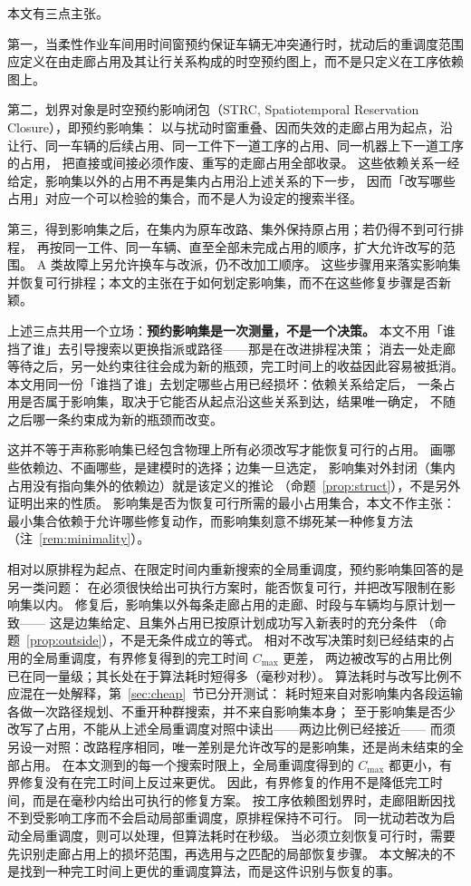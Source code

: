 \documentclass[manuscript,screen,review]{acmart}
\providecommand{\STRC}{\textsc{STRC}}
\begin{document}
本文有三点主张。

第一，当柔性作业车间用时间窗预约保证车辆无冲突通行时，扰动后的重调度范围应定义在由走廊占用及其让行关系构成的时空预约图上，而不是只定义在工序依赖图上。

第二，划界对象是时空预约影响闭包（\STRC, Spatiotemporal Reservation Closure），即预约影响集：
以与扰动时窗重叠、因而失效的走廊占用为起点，沿让行、同一车辆的后续占用、同一工件下一道工序的占用、同一机器上下一道工序的占用，
把直接或间接必须作废、重写的走廊占用全部收录。
这些依赖关系一经给定，影响集以外的占用不再是集内占用沿上述关系的下一步，
因而「改写哪些占用」对应一个可以检验的集合，而不是人为设定的搜索半径。

第三，得到影响集之后，在集内为原车改路、集外保持原占用；若仍得不到可行排程，
再按同一工件、同一车辆、直至全部未完成占用的顺序，扩大允许改写的范围。
A 类故障上另允许换车与改派，仍不改加工顺序。
这些步骤用来落实影响集并恢复可行排程；本文的主张在于如何划定影响集，而不在这些修复步骤是否新颖。

上述三点共用一个立场：\textbf{预约影响集是一次测量，不是一个决策。}
本文不用「谁挡了谁」去引导搜索以更换指派或路径——那是在改进排程决策；
消去一处走廊等待之后，另一处约束往往会成为新的瓶颈，完工时间上的收益因此容易被抵消。
本文用同一份「谁挡了谁」去划定哪些占用已经损坏：依赖关系给定后，
一条占用是否属于影响集，取决于它能否从起点沿这些关系到达，结果唯一确定，
不随之后哪一条约束成为新的瓶颈而改变。

这并不等于声称影响集已经包含物理上所有必须改写才能恢复可行的占用。
画哪些依赖边、不画哪些，是建模时的选择；边集一旦选定，
影响集对外封闭（集内占用没有指向集外的依赖边）就是该定义的推论
（命题~\ref{prop:struct}），不是另外证明出来的性质。
影响集是否为恢复可行所需的最小占用集合，本文不作主张：
最小集合依赖于允许哪些修复动作，而影响集刻意不绑死某一种修复方法
（注~\ref{rem:minimality}）。

相对以原排程为起点、在限定时间内重新搜索的全局重调度，预约影响集回答的是另一类问题：
在必须很快给出可执行方案时，能否恢复可行，并把改写限制在影响集以内。
修复后，影响集以外每条走廊占用的走廊、时段与车辆均与原计划一致——
这是边集给定、且集外占用已按原计划成功写入新表时的充分条件
（命题~\ref{prop:outside}），不是无条件成立的等式。
相对不改写决策时刻已经结束的占用的全局重调度，有界修复得到的完工时间 \(C_{\max}\) 更差，
两边被改写的占用比例已在同一量级；其长处在于算法耗时短得多（毫秒对秒）。
算法耗时与改写比例不应混在一处解释，第~\ref{sec:cheap}~节已分开测试：
耗时短来自对影响集内各段运输各做一次路径规划、不重开种群搜索，并不来自影响集本身；
至于影响集是否少改写了占用，不能从上述全局重调度对照中读出——两边比例已经接近——
而须另设一对照：改路程序相同，唯一差别是允许改写的是影响集，还是尚未结束的全部占用。
在本文测到的每一个搜索时限上，全局重调度得到的 \(C_{\max}\) 都更小，有界修复没有在完工时间上反过来更优。
因此，有界修复的作用不是降低完工时间，而是在毫秒内给出可执行的修复方案。
按工序依赖图划界时，走廊阻断因找不到受影响工序而不会启动局部重调度，原排程保持不可行。
同一扰动若改为启动全局重调度，则可以处理，但算法耗时在秒级。
当必须立刻恢复可行时，需要先识别走廊占用上的损坏范围，再选用与之匹配的局部恢复步骤。
本文解决的不是找到一种完工时间上更优的重调度算法，而是这件识别与恢复的事。
\end{document}
